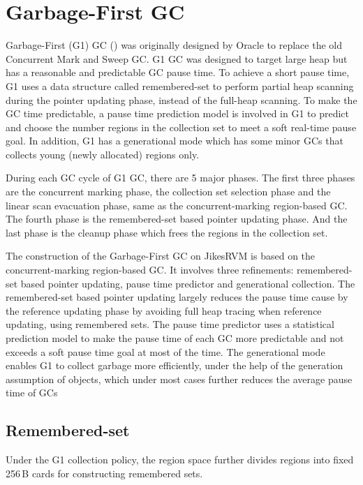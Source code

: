 \section{Garbage-First GC}
\label{sec:g1gc}

Garbage-First (G1) GC (\cite{detlefs2004garbage}) was originally designed by Oracle to replace
the old Concurrent Mark and Sweep GC. G1 GC was designed to target large heap but
has a reasonable and predictable GC pause time. To achieve a short pause time, G1
uses a data structure called remembered-set to perform partial heap scanning during the
pointer updating phase, instead of the full-heap scanning. To make the GC time predictable,
a pause time prediction model is involved in G1 to predict and choose the number regions in the
collection set to meet a soft real-time pause goal. In addition, G1 has a generational
mode which has some minor GCs that collects young (newly allocated) regions only.

During each GC cycle of G1 GC, there are 5 major phases.
The first three phases are the concurrent marking phase, the collection
set selection phase and the linear scan evacuation phase,
same as the concurrent-marking region-based GC.
The fourth phase is the remembered-set based pointer updating phase.
And the last phase is the cleanup phase which frees the regions in the collection set.

The construction of the Garbage-First GC on JikesRVM is based on the concurrent-marking
region-based GC.
It involves three refinements: remembered-set based pointer updating, pause time predictor and generational collection.
The remembered-set based pointer updating largely reduces the pause time cause by
the reference updating phase by avoiding full heap tracing when reference updating,
using remembered sets. The pause time predictor uses a statistical prediction model to make the pause time of each
GC more predictable and not exceeds a soft pause time goal at most of the time.
The generational mode enables G1 to collect garbage more efficiently, under the help
of the generation assumption of objects, which under most cases
further reduces the average pause  time of GCs

\subsection{Remembered-set}

Under the G1 collection policy, the region space further divides regions into fixed 256\,B cards for constructing remembered sets.

